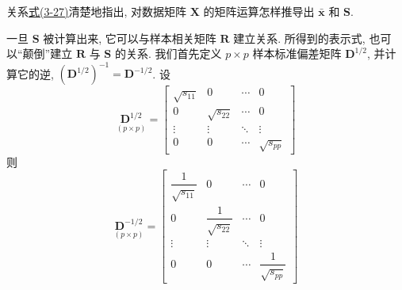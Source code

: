 关系\hyperref[eq:3-27]{式(3-27)}清楚地指出, 对数据矩阵 $\mathbf{X}$ 的矩阵运算怎样推导出 $\bar{\mathbf{x}}$ 和 $\mathbf{S}$.

一旦 $\mathbf{S}$ 被计算出来, 它可以与样本相关矩阵 $\mathbf{R}$ 建立关系. 所得到的表示式, 也可以“颠倒”建立 $\mathbf{R}$ 与 $\mathbf{S}$ 的关系. 我们首先定义 $p\times p$ 样本标准偏差矩阵 $\mathbf{D}^{1/2}$, 并计算它的逆, $(\mathbf{D}^{1/2})^{-1}=\mathbf{D}^{-1/2}$. 设
\label{eq:3-28}
\begin{equation}
\underset{(p\times p)}{\mathbf{D}^{1/2}}=\begin{bmatrix}\sqrt{s_{11}}&0&\cdots&0\\0&\sqrt{s_{22}}&\cdots&0\\\vdots&\vdots&\ddots&\vdots\\0&0&\cdots&\sqrt{s_{pp}}\end{bmatrix} \tag{3-28}
\end{equation}
则
\[
\underset{(p\times p)}{\mathbf{D}^{-1/2}}=\begin{bmatrix}\dfrac{1}{\sqrt{s_{11}}}&0&\cdots&0\\0&\dfrac{1}{\sqrt{s_{22}}}&\cdots&0\\\vdots&\vdots&\ddots&\vdots\\0&0&\cdots&\dfrac{1}{\sqrt{s_{pp}}}\end{bmatrix}
\]
